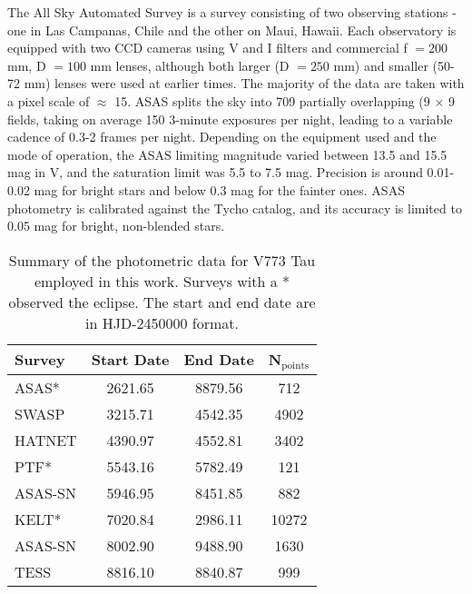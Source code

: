 \documentclass{aa}
\begin{document}
The All Sky Automated Survey \citep[ASAS; ][]{pojmanski_all_1997, asas_2005, asas_2018} is a survey consisting of two observing stations - one in Las
Campanas, Chile and the other on Maui, Hawaii. 
%
Each observatory is equipped with two CCD cameras using V and I filters and commercial f $ = 200$ mm, D $= 100$ mm lenses, although both larger (D $= 250$ mm) and smaller (50-72 mm) lenses were used at earlier times.
%
The majority of the data are taken with a pixel scale of $\approx$ 15\arcsec{}.
%
ASAS splits the sky into 709 partially overlapping (9\degr{} $\times$ 9\degr{} fields, taking on average 150 3-minute exposures per night, leading to a variable cadence of 0.3-2 frames per night.
%
Depending on the equipment used and the mode of operation, the ASAS limiting magnitude varied between 13.5 and 15.5 mag in V, and the saturation limit was 5.5 to 7.5 mag. 
%
Precision is around 0.01-0.02 mag for bright stars and below 0.3 mag for the fainter ones. 
%
ASAS photometry is calibrated against the Tycho catalog, and its accuracy is limited to 0.05 mag for bright, non-blended stars.

 \begin{table*}
\caption{Summary of the photometric data for V773 Tau employed in this work. Surveys with a * observed the eclipse. The start and end date are in HJD-2450000 format.}              %
\label{tab:v773tau_photometry}      %
\centering                                      %
\begin{tabular}{l c c c}          %
\hline\hline                        %
Survey  & Start Date & End Date & N$_{\text{points}}$ \\
\hline                  %
ASAS*              & 2621.65 &  8879.56& 712\\
SWASP  & 3215.71 & 4542.35 &  4902\\
HATNET    &4390.97 & 4552.81 & 3402\\
PTF*     & 5543.16 & 5782.49 & 121\\
ASAS-SN   & 5946.95 & 8451.85 & 882\\
KELT*   & 7020.84 & 2986.11 & 10272\\
ASAS-SN   & 8002.90 & 9488.90  & 1630\\
TESS      & 8816.10 & 8840.87 & 999\\
\hline
\end{tabular}
\end{table*}
\end{document}
